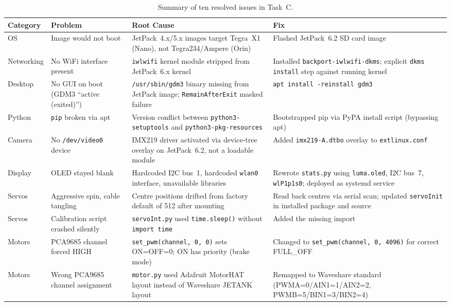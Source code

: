 \documentclass{imc-inf}
\begin{document}
\begin{table}[htbp]
\centering
\caption{Summary of ten resolved issues in Task~C.}
\label{tab:issues-summary}
\small
\begin{tabular}{@{}p{0.6in}p{1.3in}p{1.6in}p{1.6in}@{}}
\toprule
\textbf{Category} & \textbf{Problem} & \textbf{Root Cause} & \textbf{Fix} \\
\midrule
OS & Image would not boot & JetPack~4.x/5.x images target Tegra~X1 (Nano),
not Tegra234/Ampere (Orin) & Flashed JetPack~6.2 SD card image \\
Networking & No WiFi interface present & \texttt{iwlwifi} kernel module stripped
from JetPack~6.x kernel & Installed \texttt{backport-iwlwifi-dkms}; explicit
\texttt{dkms install} step against running kernel \\
Desktop & No GUI on boot
(GDM3 ``active (exited)'') & \texttt{/usr/sbin/gdm3} binary missing from JetPack
image; \texttt{RemainAfterExit} masked failure & \texttt{apt install -\/\/reinstall gdm3} \\
Python & \texttt{pip} broken via apt & Version conflict between
\texttt{python3-setuptools} and \texttt{python3-pkg-resources} & Bootstrapped pip
via PyPA install script (bypassing apt) \\
Camera & No \texttt{/dev/video0} device & IMX219 driver activated via device-tree
overlay on JetPack~6.2, not a loadable module & Added \texttt{imx219-A.dtbo}
overlay to \texttt{extlinux.conf} \\
Display & OLED stayed blank & Hardcoded I2C bus~1, hardcoded \texttt{wlan0}
interface, unavailable libraries & Rewrote \texttt{stats.py} using
\texttt{luma.oled}, I2C bus~7, \texttt{wlP1p1s0}; deployed as systemd service \\
Servos & Aggressive spin, cable tangling & Centre positions drifted from factory
default of 512 after mounting & Read back centres via serial scan; updated
\texttt{servoInit} in installed package and source \\
Servos & Calibration script crashed silently & \texttt{servoInt.py} used
\texttt{time.sleep()} without \texttt{import time} & Added the missing import \\
Motors & PCA9685 channel forced HIGH & \texttt{set\_pwm(channel, 0, 0)} sets
ON=OFF=0; ON has priority (brake mode) & Changed to
\texttt{set\_pwm(channel, 0, 4096)} for correct FULL\_OFF \\
Motors & Wrong PCA9685 channel assignment & \texttt{motor.py} used Adafruit
MotorHAT layout instead of Waveshare JETANK layout & Remapped to Waveshare
standard (PWMA=0/AIN1=1/AIN2=2, PWMB=5/BIN1=3/BIN2=4) \\
\bottomrule
\end{tabular}
\end{table}
\end{document}
